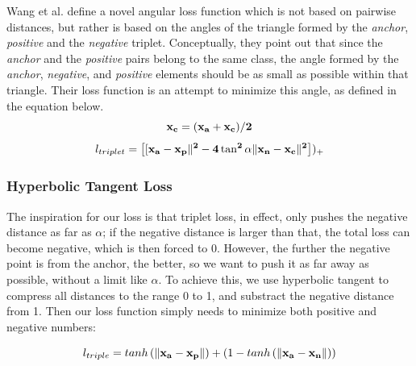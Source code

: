 Wang et al. \cite{DBLP:journals/corr/abs-1708-01682} define a novel angular loss function which is not based on pairwise distances, but rather is based on the angles of the triangle formed by the \textit{anchor}, \textit{positive} and the \textit{negative} triplet.  Conceptually, they point out that since the \textit{anchor} and the \textit{positive} pairs belong to the same class, the angle formed by the \textit{anchor}, \textit{negative}, and \textit{positive} elements should be as small as possible within that triangle.  Their loss function is an attempt to minimize this angle, as defined in the equation below.
\begin{equation}
\bf{x_{c}} = (\bf{x_{a}} + \bf{x_{c}}) / 2
\end{equation}
\begin{equation}
l_{triplet} = \left[[\bf{x_{a}} - \bf{x_{p}}\|^2 - 4 \tan^2 \alpha \|\bf{x_{n}} - \bf{x_{c}}\|^2 \right])_{+}
\end{equation}

\subsubsection{Hyperbolic Tangent Loss}

The inspiration for our loss is that triplet loss, in effect, only pushes the negative distance as far as $\alpha$; if the negative distance is larger than that, the total loss can become negative, which is then forced to 0.  However, the further the negative point is from the anchor, the better, so we want to push it as far away as possible, without a limit like $\alpha$.  To achieve this, we use hyperbolic tangent to compress all distances to the range 0 to 1, and substract the negative distance from 1.  Then our loss function simply needs to minimize both positive and negative numbers:

 \begin{equation}
  l_{triple} =  tanh\left(\|\bf{x_a} - \bf{x_p}\|\right) + \left(1-tanh\left(\|\bf{x_a} -\bf{x_n}\|\right)\right)
\label{tanh}
\end{equation}
